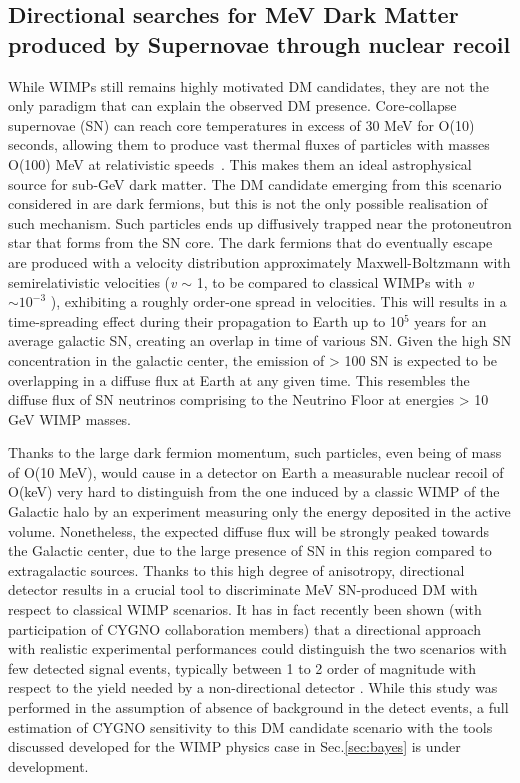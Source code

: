 \documentclass[physics,article,submit,moreauthors,pdftex]{Definitions/mdpi}
\begin{document}
\subsection{Directional searches for MeV Dark Matter produced by Supernovae through nuclear recoil}
While WIMPs still remains highly motivated DM candidates, they are not the only paradigm that can explain the observed DM presence. Core-collapse supernovae (SN) can reach core temperatures in excess of 30 MeV for O(10) seconds, allowing them to produce vast thermal fluxes of particles with masses O(100) MeV at relativistic speeds~\cite{DeRocco:2019jti}. This makes them an ideal astrophysical source for sub-GeV dark matter. The DM candidate emerging from this scenario considered in \cite{DeRocco:2019jti} are dark fermions, but this is not the only possible realisation of such mechanism. Such particles ends up diffusively trapped near the protoneutron star that forms from the SN core. The dark fermions that do eventually escape are produced with a velocity distribution approximately Maxwell-Boltzmann with semirelativistic velocities ({\it v} $\sim$ 1, to be compared to classical WIMPs with {\it v} $\sim 10^{-3}$  ), exhibiting a roughly order-one spread in velocities. This will results in a time-spreading effect during their propagation to Earth up to 10$^5$ years for an average galactic SN, creating an overlap in time of various SN. Given the high SN concentration in the galactic center, the emission of > 100 SN is expected to be overlapping in a diffuse flux at Earth at any given time. This resembles the diffuse flux of SN neutrinos comprising to the Neutrino Floor at energies > 10 GeV WIMP masses.


Thanks to the large dark fermion momentum, such particles, even being of mass of O(10 MeV), would cause in a detector on Earth a measurable nuclear recoil of O(keV) very hard to distinguish from the one induced by a classic WIMP of the Galactic halo by an experiment measuring only the energy deposited in the active volume. Nonetheless, the expected diffuse flux will be strongly peaked towards the Galactic center, due to the large presence of SN in this region compared to extragalactic sources. Thanks to this high degree of anisotropy, directional detector results in a crucial tool to discriminate MeV SN-produced DM with respect to classical WIMP scenarios. It has in fact recently been shown (with participation of CYGNO collaboration members) that a directional approach with realistic experimental performances could distinguish the two scenarios with few detected signal events, typically between 1 to 2 order of magnitude with respect to the yield needed by a non-directional detector \cite{Baracchini:2020owr}. While this study was performed in the assumption of absence of background in the detect events, a full estimation of CYGNO sensitivity to this DM candidate scenario with the tools discussed developed for the WIMP physics case in Sec.\ref{sec:bayes} is under development.
\end{document}
